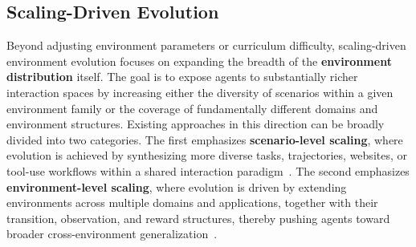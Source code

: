 \subsection{Scaling-Driven Evolution}\label{sec:scaling_evo}
Beyond adjusting environment parameters or curriculum difficulty, scaling-driven environment evolution focuses on expanding the breadth of the \textbf{environment distribution} itself.
The goal is to expose agents to substantially richer interaction spaces by increasing either the diversity of scenarios within a given environment family or the coverage of fundamentally different domains and environment structures.
Existing approaches in this direction can be broadly divided into two categories.
The first emphasizes \textbf{scenario-level scaling}, where evolution is achieved by synthesizing more diverse tasks, trajectories, websites, or tool-use workflows within a shared interaction paradigm~\cite{EnvScaler,AutoForge,AgentScaler,InfiniteWeb,AutoWebWorld}.
The second emphasizes \textbf{environment-level scaling}, where evolution is driven by extending environments across multiple domains and applications, together with their transition, observation, and reward structures, thereby pushing agents toward broader cross-environment generalization~\cite{ARE,AutoEnv}.

